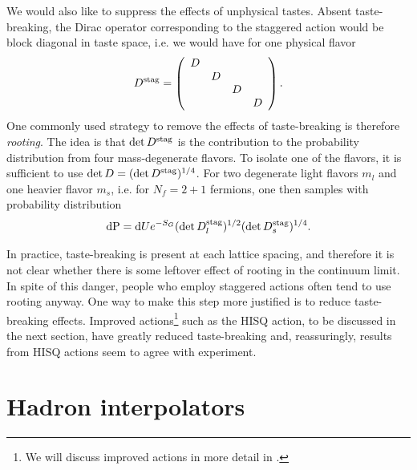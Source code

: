 We would also like to suppress the effects of unphysical tastes. Absent
taste-breaking, the Dirac operator corresponding to the staggered action
would be block diagonal in taste space, i.e. we would have for 
one physical flavor
\begin{equation}
D^{\rm stag}=\left(\begin{array}{cccc}
            D &   &  &  \\
              & D &  &  \\
              &   & D&  \\
              &   &  & D\\
            \end{array}\right).
\end{equation}
One commonly used strategy to remove the effects of taste-breaking is
therefore {\it rooting}. The idea is that $\det D^{\rm stag}$ is
the contribution to the probability distribution from four mass-degenerate
flavors. To isolate one of the flavors, it is sufficient to use
$\det D=(\det D^{\rm stag})^{1/4}$. For two degenerate light flavors
$m_l$ and one heavier flavor $m_s$, i.e. for $N_f=2+1$ fermions, 
one then samples with probability distribution
\begin{equation}\label{eq:HISQdist}
  \dd{\rm P}
    =\dd Ue^{-S_G}(\det D_l^{\rm stag})^{1/2}(\det D_s^{\rm stag})^{1/4}.
\end{equation}

In practice, taste-breaking is present at each lattice spacing, and
therefore it is not clear whether there is some leftover effect of rooting
in the continuum limit. In spite of this danger, people who employ staggered
actions often tend to use rooting anyway. One way to make this step more
justified is to reduce taste-breaking effects. Improved 
actions\footnote{We will discuss improved actions in more detail in 
.} such
as the HISQ action, to be discussed in the next section, have greatly
reduced taste-breaking and, reassuringly, results from HISQ actions
seem to agree with experiment.


\section{Hadron interpolators}\label{sec:interpolators}

